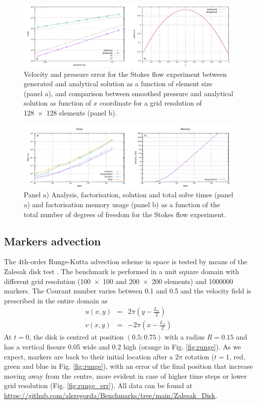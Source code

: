 \documentclass[hidelinks,10pt,a4paper]{article}
\begin{document}
\begin{figure}
\centering
\noindent\includegraphics[width=\textwidth]{./Figures/errors.pdf}
\caption{Velocity and pressure error for the Stokes flow experiment between generated and analytical solution as a function of element size (panel a),
and comparison between smoothed pressure and analytical solution as function of $x$ coordinate for a grid resolution of \num{128x128} elements (panel b).}
\label{fig:errors}
\end{figure}

\begin{figure}
\noindent\includegraphics[width=\textwidth]{./Figures/MUMPS.pdf}
\caption{Panel a) Analysis, factorisation, solution and total solve times (panel a) and factorisation memory usage (panel b) as a function of the total number
of degrees of freedom for the Stokes flow experiment.}
\label{fig:MUMPS}
\end{figure}

\subsection{Markers advection}\label{sec:runge}
The 4th-order Runge-Kutta advection scheme in space is tested by means of the Zalesak disk test \citep{Zalesak1979,Thieulot2014}. The benchmark is performed
in a unit square domain with different grid resolution (\num{100x100} and \num{200x200} elements) and 1000000 markers. The Courant number varies between 0.1
and 0.5 and the velocity field is prescribed in the entire domain as
\begin{eqnarray}
u(x,y)&=&2\pi\left(y-\frac{L_x}{2}\right)\nonumber \\
v(x,y)&=&-2\pi\left(x-\frac{L_x}{2}\right)\nonumber
\end{eqnarray}
At $t=0$, the disk is centred at position $(0.5;0.75)$ with a radius $R=0.15$ and has a vertical fissure 0.05 wide and 0.2 high (orange in Fig. \ref{fig:runge}).
As we expect, markers are back to their initial location after a $2\pi$ rotation ($t=1$, red, green and blue in Fig. \ref{fig:runge}), with an error of the
final position that increase moving away from the centre, more evident in case of higher time steps or lower grid resolution (Fig. \ref{fig:runge_err}). 
All data can be found at \url{https://github.com/aleregorda/Benchmarks/tree/main/Zalesak_Disk}.
\end{document}
